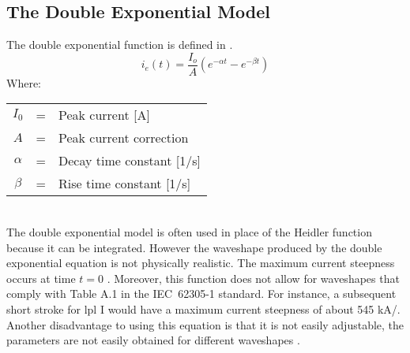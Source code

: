 \subsection{The Double Exponential Model}
\label{sub:background_double_exponential}
The double exponential function is defined in .
\begin{equation}
    i_e \left( t \right) = \frac{I_o}{A}\left( e^{-\alpha t} - e^{-\beta t} \right)
    \label{eqn:dexp}
\end{equation}
Where: \\
\begin{tabular}{cll}
    $I_0$ & = & Peak current [A] \\
    $A$ & = & Peak current correction \\
    $\alpha$ & = & Decay time constant [1/s] \\
    $\beta$ & = & Rise time constant [1/s]
\end{tabular}\\
The double exponential model is often used in place of the Heidler function because it can be integrated. However the waveshape produced by the double exponential equation is not physically realistic. The maximum current steepness occurs at time $t=0$ \cite{ZhangFeizhouandLiuShanghe2002,Lovric2013,Heidler2002,Delfino2012}. Moreover, this function does not allow for waveshapes that comply with Table A.1 in the IEC~62305-1 standard. For instance, a subsequent short stroke for \gls{lpl} I would have a maximum current steepness of about 545 kA/\usec \cite{Heidler2008}. Another disadvantage to using this equation is that it is not easily adjustable, the parameters are not easily obtained for different waveshapes \cite{Javor2011}.

